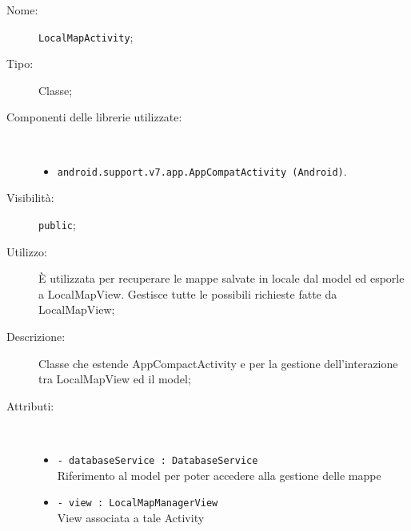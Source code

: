 \documentclass[../DefinizioneDiProdotto.tex]{subfiles}
\begin{document}
\begin{description}
	\item[Nome:] \texttt{LocalMapActivity};
	\item[Tipo:] Classe;
	\item[Componenti delle librerie utilizzate:] \
	\begin{itemize}
		\item \texttt{android.support.v7.app.AppCompatActivity (Android)}.
		
	\end{itemize}
	\item[Visibilità:] \texttt{public};
	\item[Utilizzo:] È utilizzata per recuperare le mappe salvate in locale dal model ed esporle a LocalMapView. Gestisce tutte le possibili richieste fatte da LocalMapView;
	\item[Descrizione:] Classe che estende AppCompactActivity e per la gestione dell'interazione tra LocalMapView ed il model;
	\item[Attributi:] \
	\begin{itemize}
		\item \texttt{- databaseService : DatabaseService}\\
		Riferimento al model per poter accedere alla gestione delle mappe
		
		\item \texttt{- view : LocalMapManagerView}\\
		View associata a tale Activity
		

\end{itemize}
\end{description}
\end{document}
